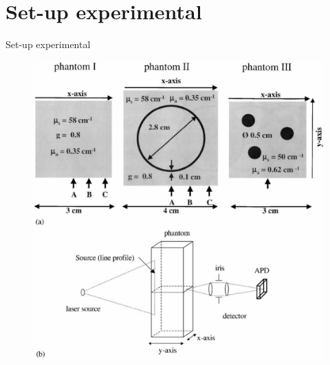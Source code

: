\documentclass[10pt]{beamer}
\begin{document}
\section{Set-up experimental}
{%
\begin{frame}[fragile]{Set-up experimental}

\begin{figure}
 \includegraphics[trim={0 0 0 17cm},clip,width=\textwidth]{fig1.eps}
\end{figure}

\end{frame}
}
\end{document}

